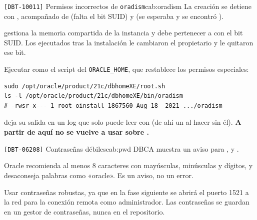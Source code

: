 \begin{cabezazo}{\texttt{[DBT-10011]} Permisos incorrectos de \texttt{oradism}}{cab:oradism}
\problema La creación se detiene con
, acompañado de
 (falta el bit SUID) y  (se esperaba
 y se encontró ).

\causa {} gestiona la memoria compartida de la instancia y debe
pertenecer a  con el bit SUID. Los  ejecutados tras la instalación le cambiaron el propietario y le
quitaron ese bit.

\solucion Ejecutar como  el script  del
\texttt{ORACLE\_HOME}, que restablece los permisos especiales:

\begin{lstlisting}[style=bash]
sudo /opt/oracle/product/21c/dbhomeXE/root.sh
ls -l /opt/oracle/product/21c/dbhomeXE/bin/oradism
# -rwsr-x--- 1 root oinstall 1867560 Aug 18  2021 .../oradism
\end{lstlisting}

 deja su salida en un log que  solo puede leer con
 (de ahí un  al hacer  sin él).
\textbf{A partir de aquí no se vuelve a usar  sobre
.}
\end{cabezazo}

\begin{cabezazo}{\texttt{[DBT-06208]} Contraseñas débiles}{cab:pwd}
\problema DBCA muestra un aviso  para ,
 y .

\causa Oracle recomienda al menos 8 caracteres con mayúsculas, minúsculas y
dígitos, y desaconseja palabras como «oracle». Es un aviso, no un error.

\solucion Usar contraseñas robustas, ya que en la fase siguiente se abrirá
el puerto 1521 a la red para la conexión remota como administrador. Las
contraseñas se guardan en un gestor de contraseñas, nunca en el repositorio.
\end{cabezazo}



